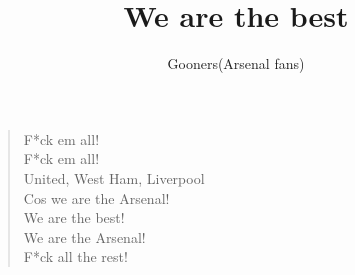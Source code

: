 \documentclass[a4paper,12pt]{article}
\title{We are the best}
\author{Gooners(Arsenal fans)}
\date{}
\begin{document}
	
	\maketitle
	
	\begin{verse}
		
		F*ck em all! \\
		F*ck em all! \\
		United, West Ham, Liverpool \\
		Cos we are the Arsenal! \\
		We are the best! \\
		We are the Arsenal! \\
		F*ck all the rest!
		
	\end{verse}
	
\end{document}
